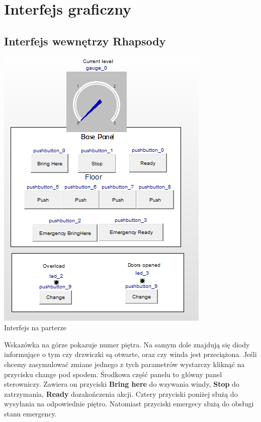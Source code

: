 \documentclass[a4paper,11pt]{article}
\begin{document}
\section{Interfejs graficzny}
	\subsection{Interfejs wewnętrzy Rhapsody}
	   
	\begin{center} 
    		\includegraphics{images/rGuiBase.PNG} \\Interfejs na parterze\\ 
  	\end{center} 
  	
  	Wskazówka na górze pokazuje numer piętra. Na samym dole znajdują się diody informujące o tym czy drzwiczki są otwarte, oraz
  	czy winda jest przeciążona. Jeśli chcemy zasymulować zmiane jednego z tych parametrów wystarczy kliknąć na przycisku change pod spodem.
  	Środkowa część panelu to główny panel sterowniczy. Zawiera on przyciski  \textbf{Bring here} do wzywania windy, \textbf{Stop}
  	do zatrzymania, \textbf{Ready} dozakończenia akcji. Cztery przyciski poniżej służą do wysyłania na odpowiednie piętro.
  	 Natomiast przyciski emergecy służą do obsługi stanu emergency.
    
\end{document}
